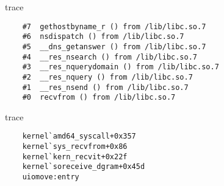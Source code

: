 \documentclass{beamer}
\begin{document}
\begin{frame}[fragile]
\begin{scriptsize}
\begin{onlyenv}
\begin{beamercolorbox}[rounded=true,shadow=true,sep=0pt,ht=3.5cm]{trace}
\begin{verbatim}
	#7  gethostbyname_r () from /lib/libc.so.7
	#6  nsdispatch () from /lib/libc.so.7
	#5  __dns_getanswer () from /lib/libc.so.7
	#4  __res_nsearch () from /lib/libc.so.7
	#3  __res_nquerydomain () from /lib/libc.so.7
	#2  __res_nquery () from /lib/libc.so.7
	#1  __res_nsend () from /lib/libc.so.7
	#0  recvfrom () from /lib/libc.so.7
	\end{verbatim}
  \end{beamercolorbox}
  \begin{beamercolorbox}[rounded=true,shadow=true,sep=0pt,ht=2cm]{trace}
	\begin{verbatim}
	kernel`amd64_syscall+0x357
	kernel`sys_recvfrom+0x86
	kernel`kern_recvit+0x22f
	kernel`soreceive_dgram+0x45d
	uiomove:entry 
	\end{verbatim}
  \end{beamercolorbox}
\end{onlyenv}
\end{scriptsize}
\end{frame}
\end{document}
